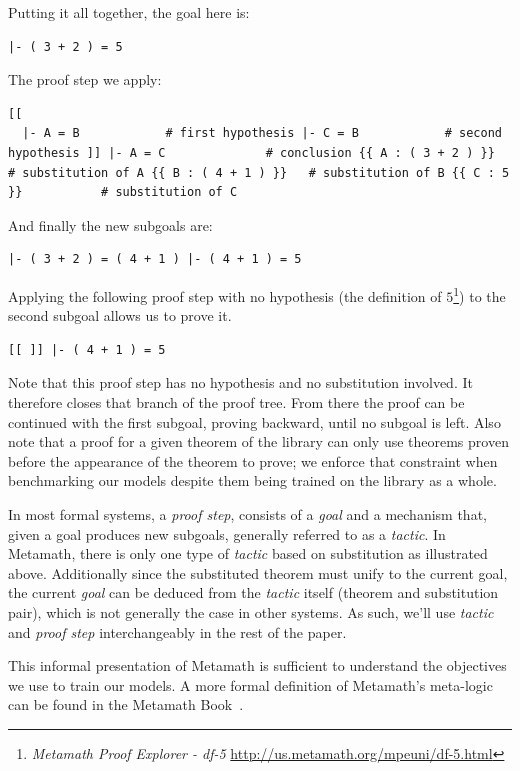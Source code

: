 Putting it all together, the goal here is:

\begin{verbatim}
|- ( 3 + 2 ) = 5
\end{verbatim}

The proof step we apply:

\begin{verbatim}
[[
  |- A = B            # first hypothesis |- C = B            # second hypothesis ]] |- A = C              # conclusion {{ A : ( 3 + 2 ) }}   # substitution of A {{ B : ( 4 + 1 ) }}   # substitution of B {{ C : 5 }}           # substitution of C
\end{verbatim}

And finally the new subgoals are:

\begin{verbatim}
|- ( 3 + 2 ) = ( 4 + 1 ) |- ( 4 + 1 ) = 5
\end{verbatim}

Applying the following proof step with no hypothesis (the definition of $5$\footnote{\textit{Metamath Proof Explorer - df-5} \url{http://us.metamath.org/mpeuni/df-5.html}}) to the second subgoal allows us to prove it.

\begin{verbatim}
[[ ]] |- ( 4 + 1 ) = 5
\end{verbatim}

Note that this proof step has no hypothesis and no substitution involved. It therefore closes that branch of the proof tree. From there the proof can be continued with the first subgoal, proving backward, until no subgoal is left. Also note that a proof for a given theorem of the library can only use theorems proven before the appearance of the theorem to prove; we enforce that constraint when benchmarking our models despite them being trained on the library as a whole.

In most formal systems, a \textit{proof step}, consists of a \textit{goal} and a mechanism that, given a goal produces new subgoals, generally referred to as a \textit{tactic}. In Metamath, there is only one type of \textit{tactic} based on substitution as illustrated above. Additionally since the substituted theorem must unify to the current goal, the current \textit{goal} can be deduced from the \textit{tactic} itself (theorem and substitution pair), which is not generally the case in other systems. As such, we'll use \textit{tactic} and \textit{proof step} interchangeably in the rest of the paper.

This informal presentation of Metamath is sufficient to understand the objectives we use to train our models. A more formal definition of Metamath's meta-logic can be found in the Metamath Book~\cite{megill2019metamath}.

